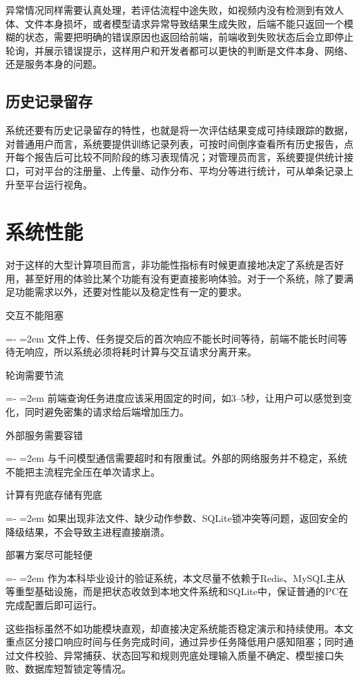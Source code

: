 \documentclass[UTF8,twoside]{ctexrep}
\makeatletter
\def@NAT@last@yr{\@citea}%
\def@NAT@last@yr{-\NAT@penalty}%
\newcommand{\researchitem}[2]{%
  \item #1%
  \par\begingroup
    \leftskip=-\leftmargin
    \rightskip=0pt
    \parindent=2em
    \noindent\hspace*{2em}\ignorespaces#2\unskip\par
  \endgroup
}
\makeatother
\begin{document}
异常情况同样需要认真处理，若评估流程中途失败，如视频内没有检测到有效人体、文件本身损坏，或者模型请求异常导致结果生成失败，后端不能只返回一个模糊的状态，需要把明确的错误原因也返回给前端，前端收到失败状态后会立即停止轮询，并展示错误提示，这样用户和开发者都可以更快的判断是文件本身、网络、还是服务本身的问题。

\subsection{历史记录留存}
系统还要有历史记录留存的特性，也就是将一次评估结果变成可持续跟踪的数据，对普通用户而言，系统要提供训练记录列表，可按时间倒序查看所有历史报告，点开每个报告后可比较不同阶段的练习表现情况；对管理员而言，系统要提供统计接口，可对平台的注册量、上传量、动作分布、平均分等进行统计，可从单条记录上升至平台运行视角。

\section{系统性能}
对于这样的大型计算项目而言，非功能性指标有时候更直接地决定了系统是否好用，甚至好用的体验比某个功能有没有更直接影响体验。对于一个系统，除了要满足功能需求以外，还要对性能以及稳定性有一定的要求。

\begin{researchlist}
  
\researchitem{交互不能阻塞}{
    文件上传、任务提交后的首次响应不能长时间等待，前端不能长时间等待无响应，所以系统必须将耗时计算与交互请求分离开来。
  }
  
\researchitem{轮询需要节流}{
    前端查询任务进度应该采用固定的时间，如3--5秒，让用户可以感觉到变化，同时避免密集的请求给后端增加压力。
  }
  
\researchitem{外部服务需要容错}{
    与千问模型通信需要超时和有限重试。外部的网络服务并不稳定，系统不能把主流程完全压在单次请求上。
  }
  
\researchitem{计算有兜底存储有兜底}{
    如果出现非法文件、缺少动作参数、SQLite锁冲突等问题，返回安全的降级结果，不会导致主进程直接崩溃。
  }
  
\researchitem{部署方案尽可能轻便}{
    作为本科毕业设计的验证系统，本文尽量不依赖于Redis、MySQL主从等重型基础设施，而是把状态收敛到本地文件系统和SQLite中，保证普通的PC在完成配置后即可运行。
  }
\end{researchlist}

这些指标虽然不如功能模块直观，却直接决定系统能否稳定演示和持续使用。本文重点区分接口响应时间与任务完成时间，通过异步任务降低用户感知阻塞；同时通过文件校验、异常捕获、状态回写和规则兜底处理输入质量不确定、模型接口失败、数据库短暂锁定等情况。
\end{document}
